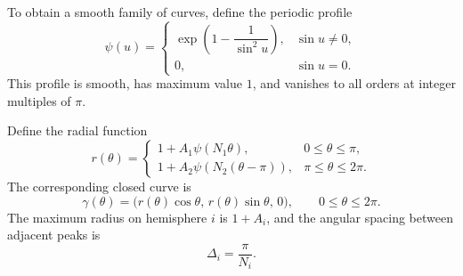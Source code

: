\documentclass{article}
\numberwithin{tm}{section}
\numberwithin{dn}{section}
\numberwithin{as}{section}
\numberwithin{rk}{section}
\numberwithin{lem}{section}
\numberwithin{ax}{section}
\numberwithin{pp}{section}
\numberwithin{eg}{section}
\numberwithin{war}{section}
\numberwithin{equation}{section}
\numberwithin{prop}{section}
\numberwithin{nt}{section}
\numberwithin{rc}{section}
\begin{document}
To obtain a smooth family of curves, define the periodic
profile
\begin{equation}
	\psi(u)=
	\begin{cases}
		\exp\!\left(1-\dfrac{1}{\sin^2 u}\right),
		& \sin u\neq 0,\\[6pt]
		0,  & \sin u=0.
	\end{cases}
\end{equation}
This profile is smooth, has maximum value $1$, and vanishes
to all orders at integer multiples of $\pi$.

Define the radial function
\[
r(\theta)=
\begin{cases}
	1+A_1\psi(N_1\theta),
	& 0\leq\theta\leq\pi,\\[4pt]
	1+A_2\psi(N_2(\theta-\pi)),
	& \pi\leq\theta\leq 2\pi.
\end{cases}
\]
The corresponding closed curve is
\[
\gamma(\theta)=
\bigl(r(\theta)\cos\theta,\,
r(\theta)\sin\theta,\,0\bigr),
\qquad 0\leq\theta\leq 2\pi.
\]
The maximum radius on hemisphere $i$ is $1+A_i$, and the
angular spacing between adjacent peaks is
\[
\Delta_i=\frac{\pi}{N_i}.
\]
\end{document}
